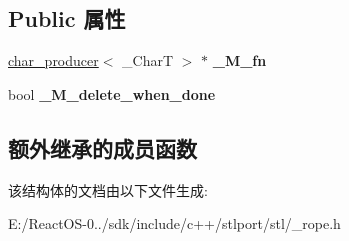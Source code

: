 \subsection*{Public 属性}
\begin{DoxyCompactItemize}
\item 
\mbox{\label{struct___rope___rope_function_acdfd2e5177fbca74ce9ffdc08b4147dd}} 
\hyperlink{classchar__producer}{char\+\_\+producer}$<$ \+\_\+\+CharT $>$ $\ast$ {\bfseries \+\_\+\+M\+\_\+fn}
\item 
\mbox{\label{struct___rope___rope_function_a589072e074b6d1abd32288926011a834}} 
bool {\bfseries \+\_\+\+M\+\_\+delete\+\_\+when\+\_\+done}
\end{DoxyCompactItemize}
\subsection*{额外继承的成员函数}


该结构体的文档由以下文件生成\+:\begin{DoxyCompactItemize}
\item 
E\+:/\+React\+O\+S-\/0../sdk/include/c++/stlport/stl/\+\_\+rope.\+h\end{DoxyCompactItemize}
